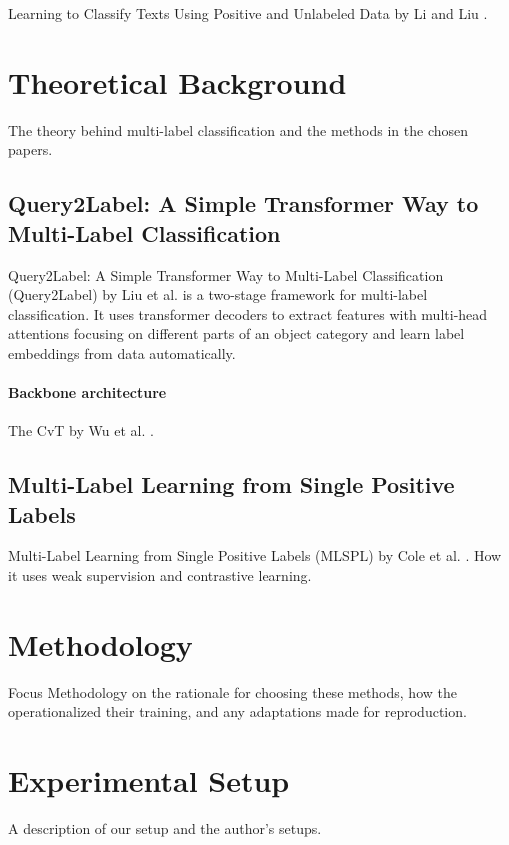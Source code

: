 \documentclass[lettersize,journal]{IEEEtran}
\begin{document}
Learning to Classify Texts Using Positive and Unlabeled Data by Li and Liu \cite{Li_2003}.


\section{Theoretical Background}
The theory behind multi-label classification and the methods in the chosen papers.

\subsection{Query2Label: A Simple Transformer Way to Multi-Label Classification}
Query2Label: A Simple Transformer Way to Multi-Label Classification (Query2Label) by Liu et al. \cite{Query2Label} is a two-stage framework for multi-label classification. It uses transformer decoders to extract features with multi-head attentions focusing on different parts of an object category and learn label embeddings from data automatically.

\paragraph{Backbone architecture}
The CvT by Wu et al. \cite{CvT}.

\subsection{Multi-Label Learning from Single Positive Labels}
Multi-Label Learning from Single Positive Labels (MLSPL) by Cole et al. \cite{mlsp}.
How it uses weak supervision and contrastive learning.


\section{Methodology}
Focus Methodology on the rationale for choosing these methods, how the operationalized their training, and any adaptations made for reproduction.


\section{Experimental Setup}
A description of our setup and the author's setups.
\end{document}
